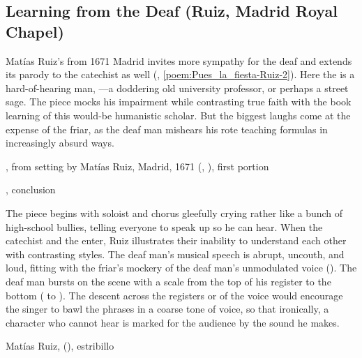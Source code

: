 
\subsection{Learning from the Deaf (Ruiz, Madrid Royal Chapel)}

Matías Ruiz's  from 1671 Madrid invites more
sympathy for the deaf and extends its parody to the catechist as well
(, \ref{poem:Pues_la_fiesta-Ruiz-2}).
Here the  is a hard-of-hearing man, ---a doddering old university professor, or perhaps a street
sage.
The piece mocks his impairment while contrasting true faith with the book
learning of this would-be humanistic scholar.
But the biggest laughs come at the expense of the friar, as the deaf man
mishears his rote teaching formulas in increasingly absurd ways.

\addtoindex{
    \RuizM;
    \RoyalChapel
}

{, from setting by
Matías Ruiz, Madrid, 1671 (, ), first
portion}

{, conclusion}

The piece begins with soloist and chorus gleefully crying  rather like a bunch of high-school bullies, telling everyone to speak
up so he can hear.
When the catechist and the  enter, Ruiz illustrates their inability
to understand each other with contrasting styles.
The deaf man's musical speech is abrupt, uncouth, and loud, fitting with the
friar's mockery of the deaf man's unmodulated voice
().
The deaf man bursts on the scene with a scale from the top of his register to
the bottom ( to ).
The descent across the registers or  of the voice would encourage
the singer to bawl the phrases in a coarse tone of voice, so that ironically, a
character who cannot hear is marked for the audience by the sound he makes.


{Matías Ruiz, 
(), estribillo} 

